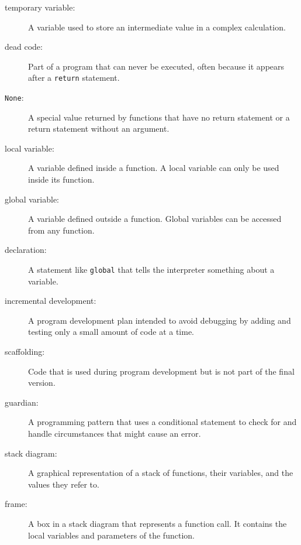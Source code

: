 \documentclass[10pt]{book}
\begin{document}
\begin{description}

\item[temporary variable:]  A variable used to store an intermediate value in
a complex calculation.

\item[dead code:]  Part of a program that can never be executed, often because
it appears after a {\tt return} statement.

\item[{\tt None}:]  A special value returned by functions that
have no return statement or a return statement without an argument.

\item[local variable:]  A variable defined inside a function.  A local
variable can only be used inside its function.

\item[global variable:]  A variable defined outside a function.  Global
variables can be accessed from any function.

\item[declaration:] A statement like {\tt global} that tells the
interpreter something about a variable.


\item[incremental development:]  A program development plan intended to
avoid debugging by adding and testing only
a small amount of code at a time.

\item[scaffolding:]  Code that is used during program development but is
not part of the final version.

\item[guardian:]  A programming pattern that uses a conditional
statement to check for and handle circumstances that
might cause an error.

\item[stack diagram:]  A graphical representation of a stack of functions,
their variables, and the values they refer to.

\item[frame:]  A box in a stack diagram that represents a function call.
It contains the local variables and parameters of the function.


\end{description}
\end{document}
